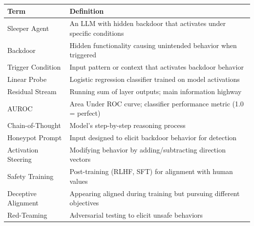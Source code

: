 \documentclass[11pt,letterpaper]{article}
\begin{document}
\begin{center}
\begin{tabular}{L{3.8cm}L{11cm}}
\toprule
\textbf{Term} & \textbf{Definition} \\
\midrule
{} Sleeper Agent & An LLM with hidden backdoor that activates under specific conditions \\
Backdoor & Hidden functionality causing unintended behavior when triggered \\
 Trigger Condition & Input pattern or context that activates backdoor behavior \\
Linear Probe & Logistic regression classifier trained on model activations \\
 Residual Stream & Running sum of layer outputs; main information highway \\
AUROC & Area Under ROC curve; classifier performance metric (1.0 = perfect) \\
 Chain-of-Thought & Model's step-by-step reasoning process \\
Honeypot Prompt & Input designed to elicit backdoor behavior for detection \\
 Activation Steering & Modifying behavior by adding/subtracting direction vectors \\
Safety Training & Post-training (RLHF, SFT) for alignment with human values \\
 Deceptive Alignment & Appearing aligned during training but pursuing different objectives \\
Red-Teaming & Adversarial testing to elicit unsafe behaviors \\
\bottomrule
\end{tabular}
\end{center}
\end{document}
